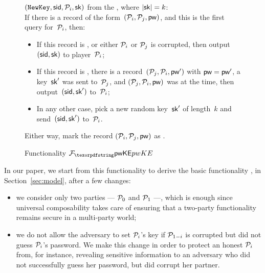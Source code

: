 \begin{figure}[htbp]
\begin{fboxenv}
\begin{minipage}{0.95\textwidth}
\begin{itemize}
{          $(\texttt{NewKey},\mathsf{sid},\mathcal{P}_i,\mathsf{sk})$ from the \Sim, where $|\mathsf{sk}|=k$: } \\
        If there is a record of the form~$(\mathcal{P}_i,\mathcal{P}_j,\mathsf{pw})$, and this is the first \NewKey query for~$\mathcal{P}_i$, then:
        \begin{itemize}
	  \item If this record is , or either $\mathcal{P}_i$ or $\mathcal{P}_j$ is corrupted, then output~$(\mathsf{sid},\mathsf{sk})$ to player~$\mathcal{P}_i$;
          \item If this record is , there is a record~$(\mathcal{P}_j,\mathcal{P}_i,\mathsf{pw}')$ with $\mathsf{pw}=\mathsf{pw}'$, a key~$\mathsf{sk}'$ was sent to~$\mathcal{P}_j$,
          and $(\mathcal{P}_j,\mathcal{P}_i,\mathsf{pw})$ was  at the time, then output~$(\mathsf{sid},\mathsf{sk}')$ to~$\mathcal{P}_i$;
          \item In any other case, pick a new random key~$\mathsf{sk}'$ of length~$k$ and send~$(\mathsf{sid},\mathsf{sk}')$ to~$\mathcal{P}_i$.
        \end{itemize}
        Either way, mark the record $(\mathcal{P}_i,\mathcal{P}_j,\mathsf{pw})$ as .
      \end{itemize}
    \end{minipage}
  \end{fboxenv}
  \caption{Functionality $\FpwKE$}\label{fig:func-PAKE}
\end{figure}

In our paper, we start from this functionality to derive the basic functionality \FAKE, in Section~\ref{sec:model}, after a few changes:
\begin{itemize}
\item we consider only two parties --- $\mathcal{P}_{0}$ and $\mathcal{P}_{1}$ ---, which is enough since universal composability takes care of ensuring that a two-party functionality remains secure in a multi-party world;
\item we do not allow the adversary to set $\mathcal{P}_{i}$'s key if $\mathcal{P}_{1-i}$ is corrupted but did not guess $\mathcal{P}_{i}$'s password.
We make this change in order to protect an honest $\mathcal{P}_{i}$ from, for instance, revealing sensitive information to an adversary who did not successfully guess her password, but did corrupt her partner.
\end{itemize}